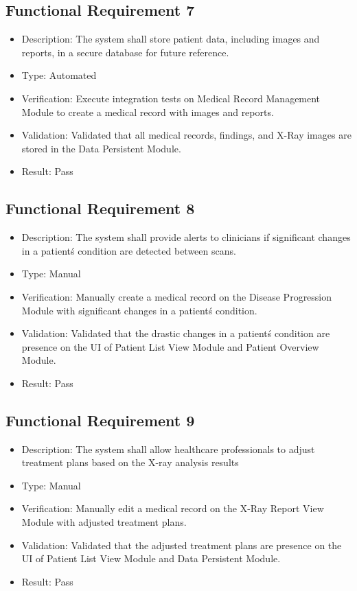\documentclass[12pt, titlepage]{article}
\begin{document}
\subsection{Functional Requirement 7}
\begin{itemize}  
  \item Description: The system shall store patient data, including images and reports, in a secure database for future reference.
  \item Type: Automated
  \item Verification: Execute integration tests on Medical Record Management Module to create a medical record with images and reports.
  \item Validation: Validated that all medical records, findings, and X-Ray images are stored in the Data Persistent Module.
  \item Result: Pass
\end{itemize}

\subsection{Functional Requirement 8}
\begin{itemize}  
  \item Description: The system shall provide alerts to clinicians if significant changes in a patient\'s condition are detected between scans.
  \item Type: Manual
  \item Verification: Manually create a medical record on the Disease Progression Module with significant changes in a patient\'s condition.
  \item Validation: Validated that the drastic changes in a patient\'s condition are presence on the UI of Patient List View Module and Patient Overview Module.
  \item Result: Pass
\end{itemize}

\subsection{Functional Requirement 9}
\begin{itemize}  
  \item Description: The system shall allow healthcare professionals to adjust treatment plans based on the X-ray analysis results
  \item Type: Manual
  \item Verification: Manually edit a medical record on the X-Ray Report View Module with adjusted treatment plans.
  \item Validation: Validated that the adjusted treatment plans are presence on the UI of Patient List View Module and Data Persistent Module.
  \item Result: Pass
\end{itemize}
\end{document}
